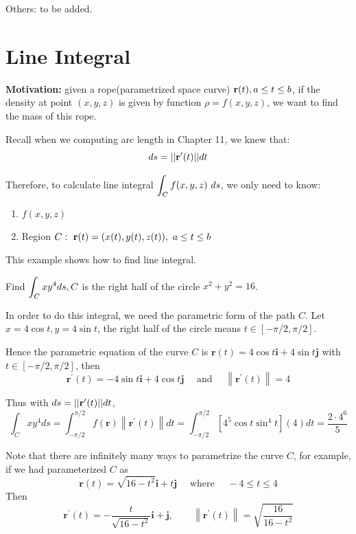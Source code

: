 \begin{spacing}{1.3}
    {\blue Others: to be added.}



    \newpage
    \section{Line Integral}
    {\bf Motivation:} given a rope(parametrized space curve) ${\bf r}(t), a\le t\le b$, if the density at 
    point $(x,y,z)$ is given by function $\rho =f(x,y,z)$, we want to find the mass of this rope.
    \begin{center}
    \end{center}

    Recall when we computing arc length in Chapter 11, we knew that: 
    $$ds=||{\bf r}'(t)|| dt$$

    Therefore, to calculate line integral $\displaystyle \int_C f(x,y,z)\ ds$, we only need to know: 
    \begin{enumerate}
        \item $f(x,y,z)$
        \item Region $C:\ \rr(t)=(x(t), y(t), z(t)),\ a\le t\le b$
    \end{enumerate}

    {\blue This example shows how to find line integral.}

    \eg Find $\displaystyle \int_{C} x y^{4} d s, C$ is the right half of the circle $x^{2}+y^{2}=16$.

    \sol In order to do this integral, we need the parametric form of the path $C$.
    Let $x=4\cos t, y=4\sin t$, the right half of the circle means $t \in[-\pi / 2, \pi / 2]$.

    Hence the parametric equation of the curve $C$ is
    $\mathbf{r}(t)=4 \cos t \mathbf{i}+4 \sin t \mathbf{j}$ with $t \in[-\pi / 2, \pi / 2]$, then
    $$\mathbf{r}^{\prime}(t)=-4 \sin t \mathbf{i}+4 \cos t \mathbf{j} \quad \text { and } \quad\left\|\mathbf{r}^{\prime}(t)\right\|=4$$

    Thus with $ds=||{\bf r}'(t)|| dt$,
    $$\int_{C} x y^{4} d s =\int_{-\pi / 2}^{\pi / 2} f(\mathbf{r})\left\|\mathbf{r}^{\prime}(t)\right\| d t=
    \int_{-\pi / 2}^{\pi / 2}\left[4^{5} \cos t \sin ^{4} t\right](4) d t =\frac{2\cdot 4^6}{5}$$

    {\blue Note that there are infinitely many ways to parametrize the curve $C$, }
    for example, if we had parameterized $C$ as
    $$\mathbf{r}(t)=\sqrt{16-t^{2}} \mathbf{i}+t \mathbf{j} \quad \text { where } \quad-4 \leqslant t \leqslant 4$$
    Then
    $$\mathbf{r}^{\prime}(t) =-\frac{t}{\sqrt{16-t^{2}}} \mathbf{i}+\mathbf{j}, \qquad
    \left\|\mathbf{r}^{\prime}(t)\right\| =\sqrt{\frac{16}{16-t^{2}}} $$


\end{spacing}
